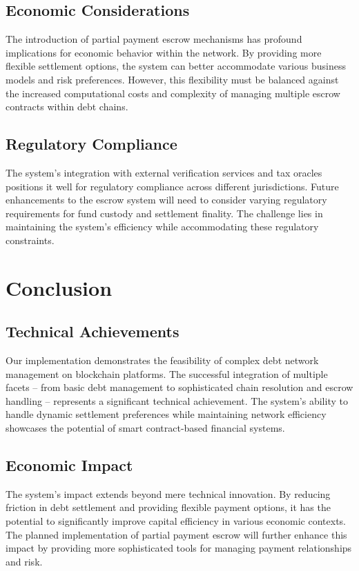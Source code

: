 \documentclass[twocolumn,10pt,a4paper]{article}
\begin{document}
\subsection{Economic Considerations}
The introduction of partial payment escrow mechanisms has profound implications for economic behavior within the network. By providing more flexible settlement options, the system can better accommodate various business models and risk preferences. However, this flexibility must be balanced against the increased computational costs and complexity of managing multiple escrow contracts within debt chains.

\subsection{Regulatory Compliance}
The system's integration with external verification services and tax oracles positions it well for regulatory compliance across different jurisdictions. Future enhancements to the escrow system will need to consider varying regulatory requirements for fund custody and settlement finality. The challenge lies in maintaining the system's efficiency while accommodating these regulatory constraints.

\section{Conclusion}
\subsection{Technical Achievements}
Our implementation demonstrates the feasibility of complex debt network management on blockchain platforms. The successful integration of multiple facets – from basic debt management to sophisticated chain resolution and escrow handling – represents a significant technical achievement. The system's ability to handle dynamic settlement preferences while maintaining network efficiency showcases the potential of smart contract-based financial systems.

\subsection{Economic Impact}
The system's impact extends beyond mere technical innovation. By reducing friction in debt settlement and providing flexible payment options, it has the potential to significantly improve capital efficiency in various economic contexts. The planned implementation of partial payment escrow will further enhance this impact by providing more sophisticated tools for managing payment relationships and risk.
\end{document}
